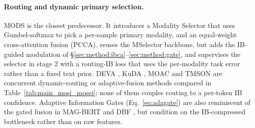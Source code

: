 \paragraph{Routing and dynamic primary selection.}
MODS \citep{wang2023cross} is the closest predecessor.
It introduces a Modality Selector that uses Gumbel-softmax to pick a
per-sample primary modality, and an equal-weight cross-attention
fusion (PCCA).
\methodname{} reuses the MSelector backbone, but adds the IB-guided
modulation of \S\ref{sec:method:ibca}--\ref{sec:method:gate}, and
supervises the selector in stage 2 with a routing-IB loss that uses
the per-modality task error rather than a fixed text prior.
DEVA \citep{deva2024}, KuDA \citep{kuda2024}, MOAC \citep{moac2025}
and TMSON \citep{tmson2024} are concurrent dynamic-routing or
adaptive-fusion methods compared in Table~\ref{tab:main_mosi_mosei};
none of them couples routing to a per-token IB confidence.
Adaptive Information Gates (Eq.~\ref{eq:adagate}) are also reminiscent
of the gated fusion in MAG-BERT and DBF \citep{wu2023dbf}, but
condition on the IB-compressed bottleneck rather than on raw
features.
